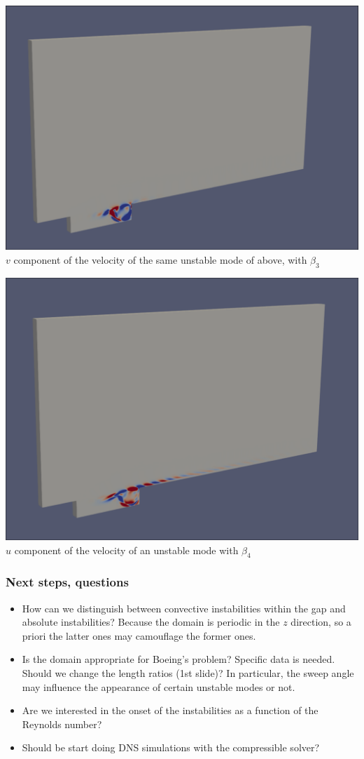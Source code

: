 \documentclass[
	aspectratio=169, %
	t, %
	onlytextwidth, %
	10pt, %
]{beamer}
\begin{document}
\begin{frame}

	\begin{center}
		\includegraphics[width=0.6\linewidth]{Images/mode3_v.png}\\[3pt]
		{\tiny\textcolor{ICLBlue}{$v$ component of the velocity of the same unstable mode of above, with $\beta_3$}}
	\end{center}


\end{frame}

\begin{frame}

	\begin{center}
		\includegraphics[width=0.6\linewidth]{Images/mode4_u.png}\\[3pt]
		{\tiny\textcolor{ICLBlue}{$u$ component of the velocity of an unstable mode with $\beta_4$}}
	\end{center}

\end{frame}

\begin{frame}
  \frametitle{Next steps, questions}

	\begin{itemize}
		\item How can we distinguish between convective instabilities within the gap and absolute instabilities? Because the domain is periodic in the $z$ direction, so a priori the latter ones may camouflage the former ones.
		\item Is the domain appropriate for Boeing's problem? Specific data is needed. Should we change the length ratios (1st slide)? In particular, the sweep angle may influence the appearance of certain unstable modes or not.
		\item Are we interested in the onset of the instabilities as a function of the Reynolds number?
		\item Should be start doing DNS simulations with the compressible solver?
	\end{itemize}
\end{frame}
\end{document}

